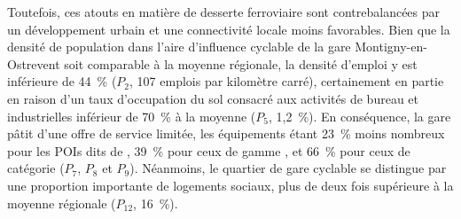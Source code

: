 \begin{refsegment}
Toutefois, ces atouts en matière de desserte ferroviaire sont contrebalancées par un développement urbain et une connectivité locale moins favorables. Bien que la densité de population dans l'aire d'influence cyclable de la gare Montigny-en-Ostrevent soit comparable à la moyenne régionale, la densité d'emploi y est inférieure de 44~\% (\(P_{2}\), 107 emplois par kilomètre carré), certainement en partie en raison d'un taux d'occupation du sol consacré aux activités de bureau et industrielles inférieur de 70~\% à la moyenne (\(P_{5}\), 1,2~\%). En conséquence, la gare pâtit d'une offre de service limitée, les équipements étant 23~\% moins nombreux pour les \acrshort{POIs} dits de , 39~\% pour ceux de gamme , et 66~\% pour ceux de catégorie  (\(P_{7}\), \(P_{8}\) et \(P_{9}\)). Néanmoins, le quartier de gare cyclable se distingue par une proportion importante de logements sociaux, plus de deux fois supérieure à la moyenne régionale (\(P_{12}\), 16~\%).%


\end{refsegment}
